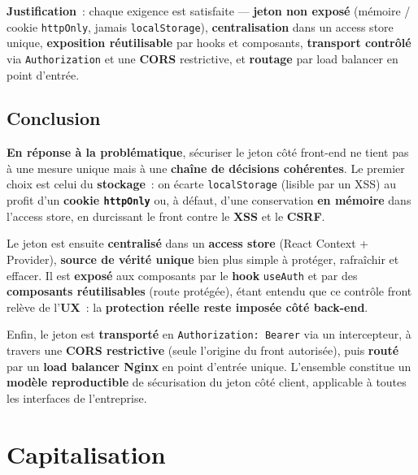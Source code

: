 \noindent \textbf{Justification}~: chaque exigence est satisfaite — \textbf{jeton non exposé} (mémoire / cookie \texttt{httpOnly}, jamais \texttt{localStorage}), \textbf{centralisation} dans un access store unique, \textbf{exposition réutilisable} par hooks et composants, \textbf{transport contrôlé} via \texttt{Authorization} et une \textbf{CORS} restrictive, et \textbf{routage} par load balancer en point d'entrée.

\newpage

\subsection*{Conclusion}
{}
\noindent \textbf{En réponse à la problématique}, sécuriser le jeton côté front-end ne tient pas à une mesure unique mais à une \textbf{chaîne de décisions cohérentes}. Le premier choix est celui du \textbf{stockage}~: on écarte \texttt{localStorage} (lisible par un XSS) au profit d'un \textbf{cookie \texttt{httpOnly}} ou, à défaut, d'une conservation \textbf{en mémoire} dans l'access store, en durcissant le front contre le \textbf{XSS} et le \textbf{CSRF}.

\vspace{0.2cm}

\noindent Le jeton est ensuite \textbf{centralisé} dans un \textbf{access store} (React Context + Provider), \textbf{source de vérité unique} bien plus simple à protéger, rafraîchir et effacer. Il est \textbf{exposé} aux composants par le \textbf{hook} \texttt{useAuth} et par des \textbf{composants réutilisables} (route protégée), étant entendu que ce contrôle front relève de l'\textbf{UX}~: la \textbf{protection réelle reste imposée côté back-end}.

\vspace{0.2cm}

\noindent Enfin, le jeton est \textbf{transporté} en \texttt{Authorization: Bearer} via un intercepteur, à travers une \textbf{CORS restrictive} (seule l'origine du front autorisée), puis \textbf{routé} par un \textbf{load balancer Nginx} en point d'entrée unique. L'ensemble constitue un \textbf{modèle reproductible} de sécurisation du jeton côté client, applicable à toutes les interfaces de l'entreprise.

\newpage

\section*{Capitalisation}

